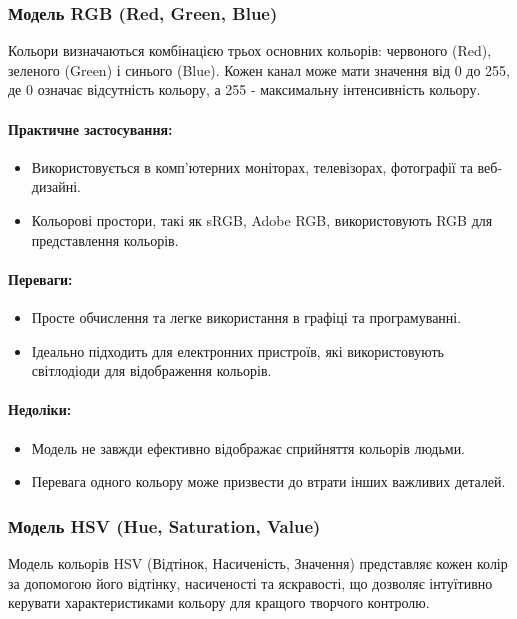 \documentclass[oneside,14pt]{extarticle}
\begin{document}
\begin{normalsize}
	\subsubsection{Модель RGB (Red, Green, Blue)}
	    Кольори визначаються комбінацією трьох основних кольорів: червоного (Red), зеленого (Green) і синього (Blue).
	Кожен канал може мати значення від 0 до 255, де 0 означає відсутність кольору, а 255 - максимальну інтенсивність кольору.
	
	\paragraph{Практичне застосування:}
	\begin{itemize}
		\item Використовується в комп'ютерних моніторах, телевізорах, фотографії та веб-дизайні.
		\item Кольорові простори, такі як sRGB, Adobe RGB, використовують RGB для представлення кольорів.
	\end{itemize}
	
	\paragraph{Переваги:}
	\begin{itemize}
		\item Просте обчислення та легке використання в графіці та програмуванні.
		\item Ідеально підходить для електронних пристроїв, які використовують світлодіоди для відображення кольорів.
	\end{itemize}
	
	\paragraph{Недоліки:}
	\begin{itemize}
		\item Модель не завжди ефективно відображає сприйняття кольорів людьми.
		\item Перевага одного кольору може призвести до втрати інших важливих деталей.
	\end{itemize}
	
	\subsubsection{Модель HSV (Hue, Saturation, Value)}
	Модель кольорів HSV (Відтінок, Насиченість, Значення) представляє кожен колір за допомогою його відтінку, насиченості та яскравості, що дозволяє інтуїтивно керувати характеристиками кольору для кращого творчого контролю.
	

\end{normalsize}
\end{document}
